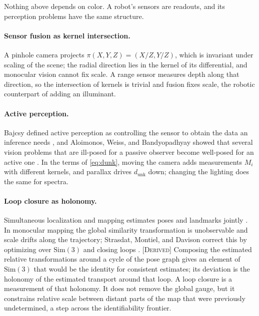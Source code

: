 \documentclass[11pt]{article}
\theoremstyle{boldplain}
\theoremstyle{boldupright}
\newcommand{\derived}{[\textup{\textsc{Derived}}]}
\newcommand{\dunk}{d_{\mathrm{unk}}}
\begin{document}
Nothing above depends on color. A robot's sensors are readouts, and its perception problems have
the same structure.

\paragraph{Sensor fusion as kernel intersection.} A pinhole camera projects $\pi(X,Y,Z)=(X/Z,Y/Z)$,
which is invariant under scaling of the scene; the radial direction lies in the kernel of its differential,
and monocular vision cannot fix scale. A range sensor measures depth along that direction, so
the intersection of kernels is trivial and fusion fixes scale, the robotic counterpart of adding an
illuminant.

\paragraph{Active perception.} Bajcsy defined active perception as controlling the sensor to obtain the data
an inference needs \cite{bajcsy1988}, and Aloimonos, Weiss, and Bandyopadhyay showed that several vision
problems that are ill-posed for a passive observer become well-posed for an active one \cite{aloimonos1988}. In the
terms of \eqref{eq:dunk}, moving the camera adds measurements $M_i$ with different kernels, and parallax drives
$\dunk$ down; changing the lighting does the same for spectra.

\paragraph{Loop closure as holonomy.} Simultaneous localization and mapping estimates poses and landmarks
jointly \cite{smith1986,durrant2006}. In monocular mapping the global similarity transformation is unobservable
and scale drifts along the trajectory; Strasdat, Montiel, and Davison correct this by optimizing
over $\mathrm{Sim}(3)$ and closing loops \cite{strasdat2010}. \derived{} Composing the estimated relative transformations
around a cycle of the pose graph gives an element of $\mathrm{Sim}(3)$ that would be the identity for consistent
estimates; its deviation is the holonomy of the estimated transport around that loop. A loop
closure is a measurement of that holonomy. It does not remove the global gauge, but it constrains
relative scale between distant parts of the map that were previously undetermined, a step across
the identifiability frontier.
\end{document}
